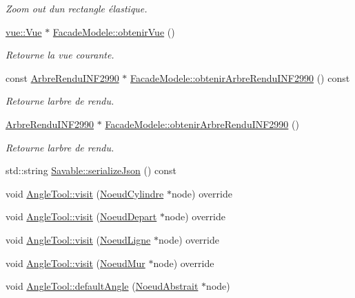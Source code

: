\begin{DoxyCompactItemize}
\begin{DoxyCompactList}\small\item\em Zoom out d\textquotesingle{}un rectangle élastique. \end{DoxyCompactList}\item 
\hyperlink{classvue_1_1_vue}{vue\+::\+Vue} $\ast$ \hyperlink{group__inf2990_gaa56cf96b7e381e0f14e2c9a55be913bf}{Facade\+Modele\+::obtenir\+Vue} ()
\begin{DoxyCompactList}\small\item\em Retourne la vue courante. \end{DoxyCompactList}\item 
const \hyperlink{class_arbre_rendu_i_n_f2990}{Arbre\+Rendu\+I\+N\+F2990} $\ast$ \hyperlink{group__inf2990_gaf578161d03b2157cdaa3182900ff61cc}{Facade\+Modele\+::obtenir\+Arbre\+Rendu\+I\+N\+F2990} () const 
\begin{DoxyCompactList}\small\item\em Retourne l\textquotesingle{}arbre de rendu. \end{DoxyCompactList}\item 
\hyperlink{class_arbre_rendu_i_n_f2990}{Arbre\+Rendu\+I\+N\+F2990} $\ast$ \hyperlink{group__inf2990_ga12d5594db6a9507b24c7e1ffcd6751af}{Facade\+Modele\+::obtenir\+Arbre\+Rendu\+I\+N\+F2990} ()
\begin{DoxyCompactList}\small\item\em Retourne l\textquotesingle{}arbre de rendu. \end{DoxyCompactList}\item 
std\+::string \hyperlink{group__inf2990_ga454a7c175c0864c3656283bafcb8413e}{Savable\+::serialize\+Json} () const 
\item 
void \hyperlink{group__inf2990_ga925fee2b000babaae1c7947a732a0bba}{Angle\+Tool\+::visit} (\hyperlink{class_noeud_cylindre}{Noeud\+Cylindre} $\ast$node) override
\item 
void \hyperlink{group__inf2990_gaaa2fc24bde51948c2288c375f19d70ae}{Angle\+Tool\+::visit} (\hyperlink{class_noeud_depart}{Noeud\+Depart} $\ast$node) override
\item 
void \hyperlink{group__inf2990_gada17fc323e1e8d6968fef2b20186e4a6}{Angle\+Tool\+::visit} (\hyperlink{class_noeud_ligne}{Noeud\+Ligne} $\ast$node) override
\item 
void \hyperlink{group__inf2990_ga5bf124eb8955a829e87743cc6a737b49}{Angle\+Tool\+::visit} (\hyperlink{class_noeud_mur}{Noeud\+Mur} $\ast$node) override
\item 
void \hyperlink{group__inf2990_gac864ba35d8073ed9564a0a90d4df351d}{Angle\+Tool\+::default\+Angle} (\hyperlink{class_noeud_abstrait}{Noeud\+Abstrait} $\ast$node)

\end{DoxyCompactItemize}
